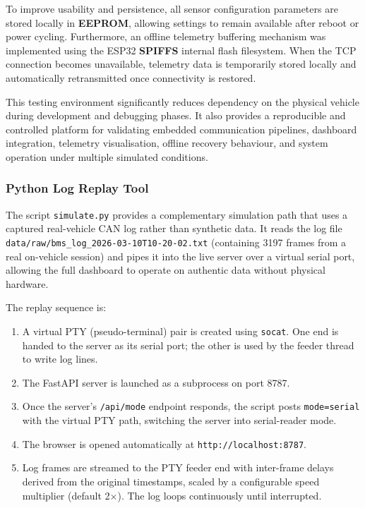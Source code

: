 To improve usability and persistence, all sensor configuration parameters are stored locally in \textbf{EEPROM}, allowing settings to remain available after reboot or power cycling. Furthermore, an offline telemetry buffering mechanism was implemented using the ESP32 \textbf{SPIFFS} internal flash filesystem. When the TCP connection becomes unavailable, telemetry data is temporarily stored locally and automatically retransmitted once connectivity is restored.

This testing environment significantly reduces dependency on the physical vehicle during development and debugging phases. It also provides a reproducible and controlled platform for validating embedded communication pipelines, dashboard integration, telemetry visualisation, offline recovery behaviour, and system operation under multiple simulated conditions.

\subsubsection*{Python Log Replay Tool}

The script \texttt{simulate.py} provides a complementary simulation path that uses a captured real-vehicle CAN log rather than synthetic data. It reads the log file \texttt{data/raw/bms\_log\_2026-03-10T10-20-02.txt} (containing 3197 frames from a real on-vehicle session) and pipes it into the live server over a virtual serial port, allowing the full dashboard to operate on authentic data without physical hardware.

The replay sequence is:
\begin{enumerate}
    \item A virtual PTY (pseudo-terminal) pair is created using \texttt{socat}. One end is handed to the server as its serial port; the other is used by the feeder thread to write log lines.
    \item The FastAPI server is launched as a subprocess on port 8787.
    \item Once the server's \texttt{/api/mode} endpoint responds, the script posts \texttt{mode=serial} with the virtual PTY path, switching the server into serial-reader mode.
    \item The browser is opened automatically at \texttt{http://localhost:8787}.
    \item Log frames are streamed to the PTY feeder end with inter-frame delays derived from the original timestamps, scaled by a configurable speed multiplier (default 2$\times$). The log loops continuously until interrupted.
\end{enumerate}

